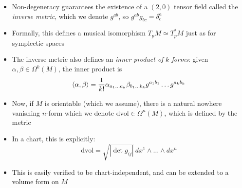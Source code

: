 \documentclass[12pt,a4paper]{article}
\numberwithin{equation}{section}
\begin{document}
\begin{itemize}
		\item Non-degeneracy guarantees the existence of a $(2,0)$ tensor field called the \textit{inverse metric}, which we denote $g^{ab}$, so $g^{ab}g_{bc}=\delta^{a}_{c}$
		\item Formally, this defines a musical isomorphism $T_{p}M\simeq T_{p}^{*}M$ just as for symplectic spaces
		\item The inverse metric also defines an \textit{inner product of} $k$\textit{-forms}: given $\alpha,\beta\in\Omega^{k}(M)$, the inner product is
		\begin{equation}
			\braket{\alpha,\beta}=\frac{1}{k!}\alpha_{a_{1}\ldots a_{k}}\beta_{b_{1}\ldots b_{k}}g^{a_{1}b_{1}}\ldots g^{a_{k}b_{k}}
		\end{equation}
		\item Now, if $M$ is orientable (which we assume), there is a natural nowhere vanishing $n$-form which we denote $\text{dvol}\in\Omega^{n}(M)$, which is defined by the metric
		\item In a chart, this is explicitly:
		\begin{equation}
			\text{dvol}=\sqrt{\left\lvert\det{g_{ij}}\right\rvert}\,dx^{1}\wedge\ldots \wedge dx^{n}
		\end{equation}
		\item This is easily verified to be chart-independent, and can be extended to a volume form on $M$
	\end{itemize}
\end{document}

